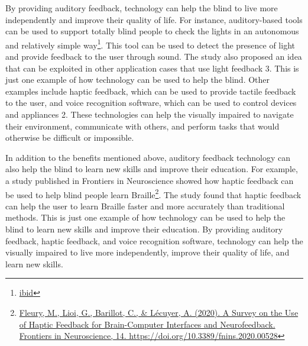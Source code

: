 \documentclass[14pt,letterpaper,twoside]{extreport}
\begin{document}
By providing auditory feedback, technology can help the blind to live more independently and improve their quality of life. For instance, auditory-based tools can be used to support totally blind people to check the lights in an autonomous and relatively simple way\footnote{\href{https://link.springer.com/article/10.1007/s12652-020-01944-w}{ibid}}. This tool can be used to detect the presence of light and provide feedback to the user through sound. The study also proposed an idea that can be exploited in other application cases that use light feedback 3. This is just one example of how technology can be used to help the blind. Other examples include haptic feedback, which can be used to provide tactile feedback to the user, and voice recognition software, which can be used to control devices and appliances 2. These technologies can help the visually impaired to navigate their environment, communicate with others, and perform tasks that would otherwise be difficult or impossible.

In addition to the benefits mentioned above, auditory feedback technology can also help the blind to learn new skills and improve their education. For example, a study published in Frontiers in Neuroscience showed how haptic feedback can be used to help blind people learn Braille\footnote{\href{https://www.frontiersin.org/articles/10.3389/fnins.2020.00528/full}{Fleury, M., Lioi, G., Barillot, C., \& Lécuyer, A. (2020). A Survey on the Use of Haptic Feedback for Brain-Computer Interfaces and Neurofeedback. Frontiers in Neuroscience, 14. https://doi.org/10.3389/fnins.2020.00528}}. The study found that haptic feedback can help the user to learn Braille faster and more accurately than traditional methods. This is just one example of how technology can be used to help the blind to learn new skills and improve their education. By providing auditory feedback, haptic feedback, and voice recognition software, technology can help the visually impaired to live more independently, improve their quality of life, and learn new skills.
\end{document}
